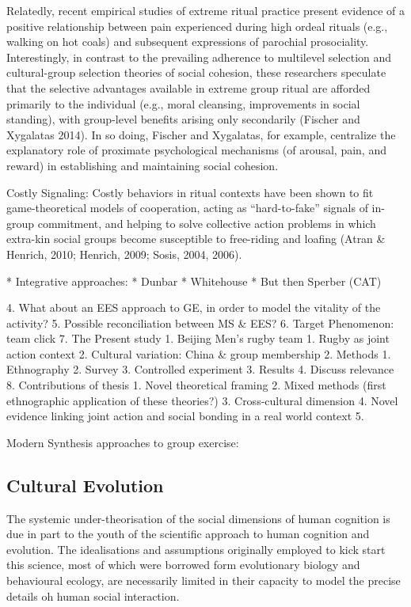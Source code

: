 Relatedly, recent empirical studies of extreme ritual practice present evidence of a positive relationship between pain experienced during high ordeal rituals (e.g., walking on hot coals) and subsequent expressions of parochial prosociality. Interestingly, in contrast to the prevailing adherence to multilevel selection and cultural-group selection theories of social cohesion, these researchers speculate that the selective advantages available in extreme group ritual are afforded primarily to the individual (e.g., moral cleansing, improvements in social standing), with group-level benefits arising only secondarily (Fischer and Xygalatas 2014). In so doing, Fischer and Xygalatas, for example, centralize the explanatory role of proximate psychological mechanisms (of arousal, pain, and reward) in establishing and maintaining social cohesion.


Costly Signaling:
Costly behaviors in ritual contexts have been shown to fit game-theoretical models of cooperation, acting as “hard-to-fake” signals of in-group commitment, and helping to solve collective action problems in which extra-kin social groups become susceptible to free-riding and loafing (Atran & Henrich, 2010; Henrich, 2009; Sosis, 2004, 2006).

* Integrative approaches:
    * Dunbar
    * Whitehouse
    * But then Sperber (CAT)



4. What about an EES approach to GE, in order to model the vitality of the activity?
5. Possible reconciliation between MS & EES?
6. Target Phenomenon: team click
7. The Present study
    1. Beijing Men’s rugby team
        1. Rugby as joint action context
        2. Cultural variation: China & group membership
    2. Methods
        1. Ethnography
        2. Survey
        3. Controlled experiment
    3. Results
    4. Discuss relevance
8. Contributions of thesis
    1. Novel theoretical framing
    2. Mixed methods (first ethnographic application of these theories?)
    3. Cross-cultural dimension
    4. Novel evidence linking joint action and social bonding in a real world context
    5.


Modern Synthesis approaches to group exercise:



\subsection{Cultural Evolution} %
The systemic under-theorisation of the social dimensions of human cognition is due in part to the youth of the scientific approach to human cognition and evolution. The idealisations and assumptions originally employed to kick start this science, most of which were borrowed form evolutionary biology and behavioural ecology, are necessarily limited in their capacity to model the precise details oh human social interaction.


